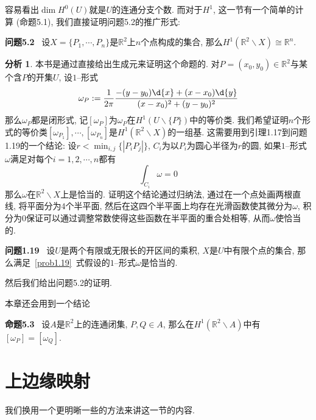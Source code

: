 \documentclass[11pt]{article}
\theoremstyle{definition}\newtheorem*{analyse}{分析}
\theoremstyle{remark}\newtheorem{rem*}{评注}
\newenvironment{env}[1]{\par\vspace{1em}\noindent\textbf{#1}\ }{\par\vspace{1em}}
\begin{document}
容易看出$\dim H^0(U)$就是$U$的连通分支个数.
而对于$H^1$, 这一节有一个简单的计算 (命题5.1), 我们直接证明问题5.2的推广形式:
\begin{env}{问题5.2}
    设$X=\{P_1,\cdots,P_n\}$是$\mathbb{R}^2$上$n$个点构成的集合, 那么$H^1(\mathbb{R}^2\backslash X)\cong\mathbb{R}^n$.
\end{env}
\begin{analyse}
    本书是通过直接给出生成元来证明这个命题的.
    对$P=(x_0,y_0)\in\mathbb{R}^2$与某个含$P$的开集$U$, 设$1$--形式
    \[\omega_P:=\frac{1}{2\pi}\frac{-(y-y_0)\d{x}+(x-x_0)\d{y}}{(x-x_0)^2+(y-y_0)^2}\]
    那么$\omega_P$都是闭形式, 记$[\omega_P]$为$\omega_P$在$H^1(U\backslash\{P\})$中的等价类.
    我们希望证明$n$个形式的等价类$[\omega_{P_1}],\cdots,[\omega_{P_n}]$是$H^1(\mathbb{R}^2\backslash X)$的一组基.
    这需要用到引理1.17到问题1.19的一个结论:
    设$r<\min_{i,j}\{|P_iP_j|\}$, $C_i$为以$P_i$为圆心半径为$r$的圆, 如果$1$--形式$\omega$满足对每个$i=1,2,\cdots,n$都有
    \begin{equation}
        \int_{C_i}\omega=0\label{prob1.19}
    \end{equation}
    那么$\omega$在$\mathbb{R}^2\backslash X$上是恰当的.
    证明这个结论通过归纳法, 通过在一个点处画两根直线, 将平面分为$4$个半平面, 然后在这四个半平面上均存在光滑函数使其微分为$\omega$,
    积分为$0$保证可以通过调整常数使得这些函数在半平面的重合处相等, 从而$\omega$使恰当的.
\end{analyse}
\begin{env}{问题1.19}
    设$U$是两个有限或无限长的开区间的乘积, $X$是$U$中有限个点的集合, 那么满足~\eqref{prob1.19}~式假设的$1$--形式$\omega$是恰当的.
\end{env}
\vskip 8cm

然后我们给出问题5.2的证明.
\vskip 8cm

本章还会用到一个结论
\begin{env}{命题5.3}
    设$A$是$\mathbb{R}^2$上的连通闭集, $P,Q\in A$, 那么在$H^1(\mathbb{R}^2\backslash A)$中有$[\omega_P]=[\omega_Q]$.
\end{env}
\vskip 8cm

\section{上边缘映射}
我们换用一个更明晰一些的方法来讲这一节的内容.
\end{document}
